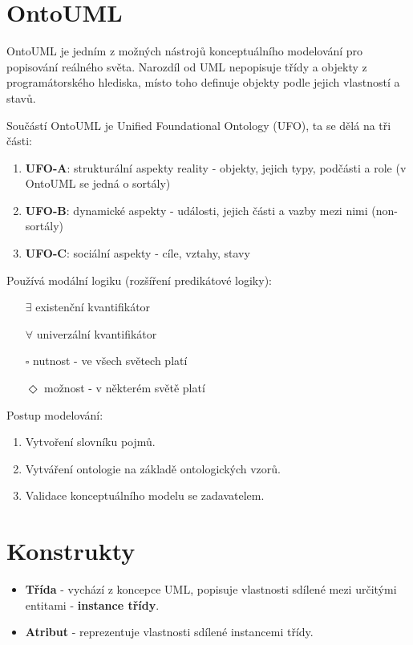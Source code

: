 \documentclass{szzclass}
\begin{document}
\section{OntoUML}
OntoUML je jedním z možných nástrojů konceptuálního modelování pro popisování reálného světa. Narozdíl od UML nepopisuje třídy a objekty z programátorského hlediska, místo toho definuje objekty podle jejich vlastností a stavů.

Součástí OntoUML je Unified Foundational Ontology (UFO), ta se dělá na tři části:
\begin{enumerate}
  \item \textbf{UFO-A}: strukturální aspekty reality - objekty, jejich typy, podčásti a role (v OntoUML se jedná o sortály)
  \item \textbf{UFO-B}: dynamické aspekty - události, jejich části a vazby mezi nimi (non-sortály)
  \item \textbf{UFO-C}: sociální aspekty - cíle, vztahy, stavy
\end{enumerate}

Používá modální logiku (rozšíření predikátové logiky):
\begin{itemize}
  \item[$\exists$] existenční kvantifikátor
  \item[$\forall$] univerzální kvantifikátor
  \item[$\square$] nutnost - ve všech světech platí
  \item[$\Diamond$] možnost - v některém světě platí
\end{itemize}

Postup modelování:
\begin{enumerate}
\item Vytvoření slovníku pojmů.
\item Vytváření ontologie na základě ontologických vzorů.
\item Validace konceptuálního modelu se zadavatelem.
\end{enumerate}

\section{Konstrukty}

\begin{itemize}
\item \textbf{Třída} - vychází z koncepce UML, popisuje vlastnosti sdílené mezi určitými entitami - \textbf{instance třídy}.
\item \textbf{Atribut} - reprezentuje vlastnosti sdílené instancemi třídy.
\end{itemize}
\end{document}
